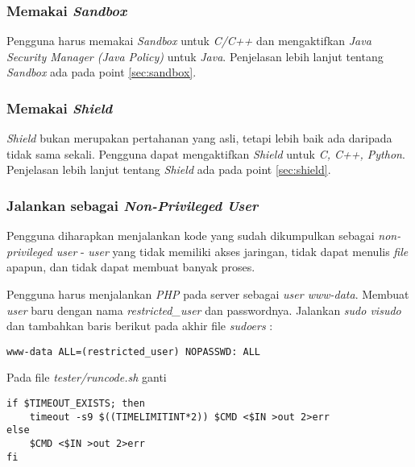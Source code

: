\subsubsection{Memakai \textit{Sandbox}}
\label{subsubsec:memakai_sandbox}
Pengguna harus memakai \textit{Sandbox} untuk \textit{C/C++} dan mengaktifkan \textit{Java Security Manager (Java Policy)} untuk \textit{Java}. Penjelasan lebih lanjut tentang \textit{Sandbox} ada pada point \ref{sec:sandbox}.

\subsubsection{Memakai \textit{Shield}}
\label{subsubsec:memakai_shield}
\textit{Shield} bukan merupakan pertahanan yang asli, tetapi lebih baik ada daripada tidak sama sekali. Pengguna dapat mengaktifkan \textit{Shield} untuk \textit{C, C++, Python}. Penjelasan lebih lanjut tentang \textit{Shield} ada pada point \ref{sec:shield}.

\subsubsection{Jalankan sebagai \textit{Non-Privileged User}}
\label{subsubsec:non_prileged_user}
Pengguna diharapkan menjalankan kode yang sudah dikumpulkan sebagai \textit{non-privileged user} - \textit{user} yang tidak memiliki akses jaringan, tidak dapat menulis \textit{file} apapun, dan tidak dapat membuat banyak proses.

Pengguna harus menjalankan \textit{PHP} pada server sebagai \textit{user www-data}. Membuat \textit{user} baru dengan nama \textit{restricted\_user} dan passwordnya. Jalankan \textit{sudo visudo} dan tambahkan baris berikut pada akhir file \textit{sudoers} :

\begin{lstlisting}[basicstyle=\ttfamily, frame=single,
columns=fullflexible, keepspaces=true, breaklines=true, label=ls:13]
www-data ALL=(restricted_user) NOPASSWD: ALL
\end{lstlisting}

Pada file \textit{tester/runcode.sh} ganti 

\begin{lstlisting}[basicstyle=\ttfamily, frame=single,
columns=fullflexible, keepspaces=true, breaklines=true, label=ls:14]
if $TIMEOUT_EXISTS; then
	timeout -s9 $((TIMELIMITINT*2)) $CMD <$IN >out 2>err
else
	$CMD <$IN >out 2>err        
fi
\end{lstlisting}

